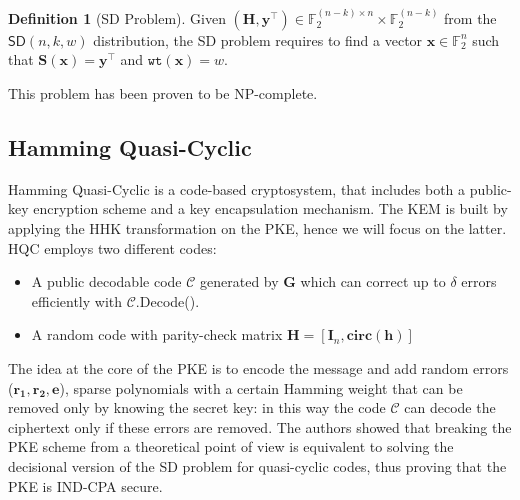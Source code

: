 \documentclass[11pt,a4paper,twocolumn]{article}
\theoremstyle{definition}
\newtheorem{definition}{Definition}[section]
\begin{document}
\begin{definition}[\textsf{SD} Problem]
    Given $(\mathbf{H}, \mathbf{y}^\top) \in \mathds{F}_2^{(n-k)\times n} \times \mathds{F}_2^{(n-k)}$ from the $\textsf{SD}(n, k, w)$ 
    distribution, the \textsf{SD} problem requires to find a vector $\mathbf{x} \in \mathds{F}_2^n$ such that 
    $\mathbf{S}(\mathbf{x}) = \mathbf{y}^\top$ and $\texttt{wt}(\mathbf{x}) = w$.
\end{definition}
This problem has been proven to be NP-complete.

\subsection{Hamming Quasi-Cyclic}
    Hamming Quasi-Cyclic is a code-based cryptosystem, that includes both a public-key
    encryption scheme and a key encapsulation mechanism. The KEM is built by applying the HHK
    transformation on the PKE, hence we will focus on the latter.
    HQC employs two different codes:
    \begin{itemize}
        \item A public decodable code $\mathcal{C}$ generated by $\mathbf{G}$ which can correct
        up to $\delta$ errors efficiently with $\mathcal{C}$.\textsf{Decode}().
        \item A random code with parity-check matrix $\mathbf{H} = [\mathbf{I}_n, \mathbf{circ}(\mathbf{h})]$
    \end{itemize}
    The idea at the core of the PKE is to encode the message and add random errors
    ($\mathbf{r_1, r_2, e}$), sparse polynomials with a certain Hamming weight
    that can be removed only by knowing the secret key: in this way the code $\mathcal{C}$
    can decode the ciphertext only if these errors are removed. The authors showed that breaking
    the PKE scheme from a theoretical point of view is equivalent to solving the decisional version 
    of the \textsf{SD} problem for quasi-cyclic codes, thus proving that the PKE is IND-CPA secure.
\end{document}
